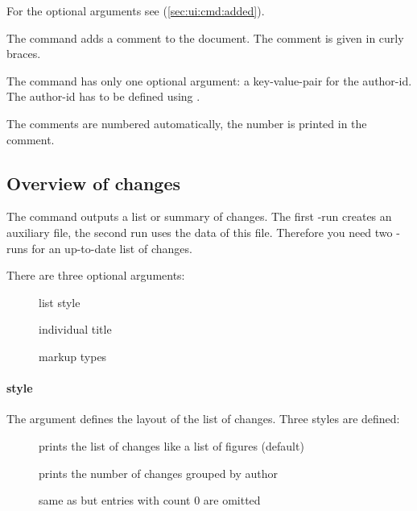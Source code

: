 For the optional arguments see  (\autoref{sec:ui:cmd:added}).





The command  adds a comment to the document.
The comment is given in curly braces.

The command has only one optional argument: a key-value-pair for the author-id.
The author-id has to be defined using .

The comments are numbered automatically, the number is printed in the comment.





\subsection{Overview of changes}
\label{sec:ui:overview}




The command  outputs a list or summary of changes.
The first -run creates an auxiliary file, the second run uses the data of this file.
Therefore you need two -runs for an up-to-date list of changes.

There are three optional arguments:

\begin{description}
	\item[] list style
	\item[] individual title
	\item[] markup types
\end{description}

\paragraph{style}
The  argument defines the layout of the list of changes.
Three styles are defined:

\begin{description}
	\item[] prints the list of changes like a list of figures (default)
	\item[] prints the number of changes grouped by author
	\item[] same as  but entries with count 0 are omitted
\end{description}


